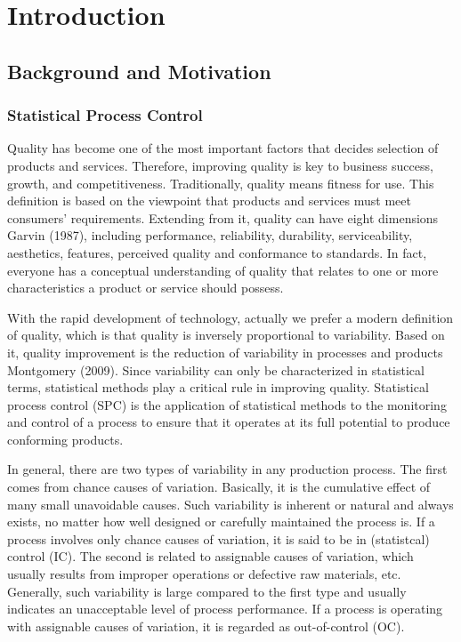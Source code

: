 \chapter{Introduction}\label{chp1}


\section{Background and Motivation}\label{sec1.1}

\subsection{Statistical Process Control}

Quality has become one of the most important factors that decides selection of
products and services. Therefore, improving quality is key to business success,
growth, and competitiveness. Traditionally, quality means fitness for use. This
definition is based on the viewpoint that products and services must meet consumers'
requirements. Extending from it, quality can have eight dimensions Garvin (1987),
including performance, reliability, durability, serviceability, aesthetics,
features, perceived quality and conformance to standards. In fact, everyone has a
conceptual understanding of quality that relates to one or more characteristics a
product or service should possess.

With the rapid development of technology, actually we prefer a modern definition of
quality, which is that quality is inversely proportional to variability. Based on
it, quality improvement is the reduction of variability in processes and products
Montgomery (2009). Since variability can only be characterized in statistical terms,
statistical methods play a critical rule in improving quality. Statistical process
control (SPC) is the application of statistical methods to the monitoring and
control of a process to ensure that it operates at its full potential to produce
conforming products.

In general, there are two types of variability in any production process. The first
comes from chance causes of variation. Basically, it is the cumulative effect of
many small unavoidable causes. Such variability is inherent or natural and always
exists, no matter how well designed or carefully maintained the process is. If a
process involves only chance causes of variation, it is said to be in (statistcal)
control (IC). The second is related to assignable causes of variation, which usually
results from improper operations or defective raw materials, etc. Generally, such
variability is large compared to the first type and usually indicates an
unacceptable level of process performance. If a process is operating with assignable
causes of variation, it is regarded as out-of-control (OC).

